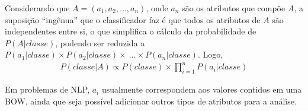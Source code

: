 Considerando que \(A= ( a_1, a_2, \ldots , a_n)\), onde \(a_n\) são os atributos que compõe \(A\), a suposição ``ingênua'' que o classificador faz é que todos os atributos de \(A\) são independentes entre si, o que simplifica o cálculo da probabilidade de \(P(A|classe)\), podendo ser reduzida a \(P(a_1|classe) \times P(a_2|classe) \times\ \ldots \times P(a_n|classe)\). Logo,
%
\begin{align}
P(classe|A) \propto P(classe) \times \prod_{i=1}^{n} P(a_i|classe)
\end{align}

Em problemas de NLP, \(a_i\) usualmente correspondem aos valores contidos em uma BOW, ainda que seja possível adicionar outros tipos de atributos para a análise.
